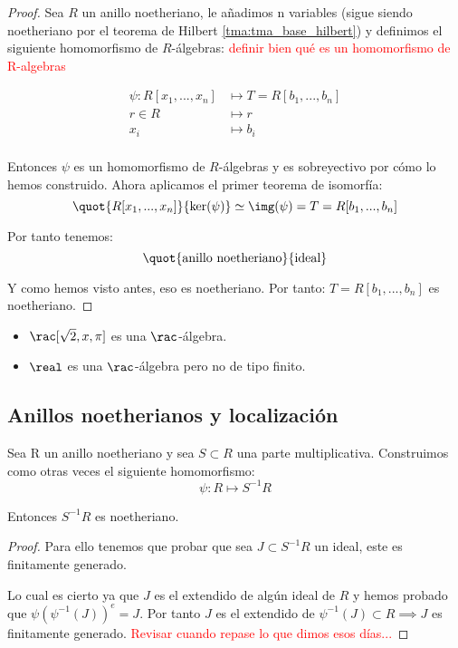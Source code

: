 \begin{proof}
	Sea $R$ un anillo noetheriano, le añadimos n variables (sigue siendo noetheriano por el teorema de Hilbert \ref{tma:tma_base_hilbert}) y definimos el siguiente homomorfismo de $R$-álgebras: \textcolor{red}{definir bien qué es un homomorfismo de R-algebras}
	
	\begin{align*}
		\psi: R[x_1,...,x_n] & \longmapsto  T=R[b_1,...,b_n]\\
		r \in R & \longmapsto r \\
		x_i & \longmapsto b_i \\
	\end{align*}
	
	Entonces $\psi$ es un homomorfismo de $R$-álgebras y es sobreyectivo por cómo lo hemos construido. Ahora aplicamos el primer teorema de isomorfía:
	$$ \quot{R[x_1,...,x_n]}{\ker(\psi)} \simeq \img(\psi)=T=R[b_1,...,b_n]$$
	
	Por tanto tenemos:
	 $$\quot{\text{anillo noetheriano}}{\text{ideal}}$$
	 
	Y como hemos visto antes, eso es noetheriano. Por tanto: $T=R[b_1,...,b_n]$ es noetheriano.
\end{proof}

\begin{example}
	\begin{itemize}
		\item $\rac[\sqrt{2},x, \pi]$ es una $\rac$-álgebra.
		\item $\real$ es una $\rac$-álgebra pero no de tipo finito.
	\end{itemize}
\end{example}

\subsection{Anillos noetherianos y localización}

\begin{prop}
	Sea R un anillo noetheriano y sea $S\subset R$ una parte multiplicativa. Construimos como otras veces el siguiente homomorfismo:
	$$\psi: R \longmapsto S^{-1}R$$
	
	Entonces $S^{-1}R$ es noetheriano.
\end{prop}
\begin{proof}
	Para ello tenemos que probar que sea $J \subset S^{-1}R$ un ideal, este es finitamente generado.
	
	Lo cual es cierto ya que $J$ es el extendido de algún ideal de $R$ y hemos probado que $\psi(\psi^{-1}(J))^e=J$. Por tanto $J$ es el extendido de $\psi^{-1}(J)\subset R \implies J$ es finitamente generado. \textcolor{red}{Revisar cuando repase lo que dimos esos días...} %
\end{proof}


